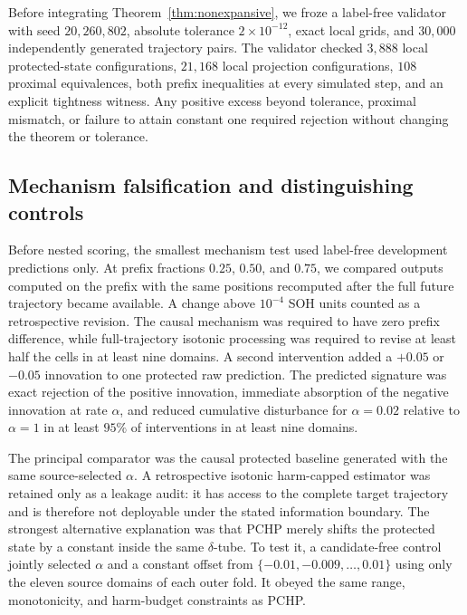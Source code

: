\documentclass[11pt]{article}
\begin{document}
Before integrating Theorem~\ref{thm:nonexpansive}, we froze a label-free validator with seed $20{,}260{,}802$, absolute tolerance $2\times10^{-12}$, exact local grids, and $30{,}000$ independently generated trajectory pairs. The validator checked $3{,}888$ local protected-state configurations, $21{,}168$ local projection configurations, $108$ proximal equivalences, both prefix inequalities at every simulated step, and an explicit tightness witness. Any positive excess beyond tolerance, proximal mismatch, or failure to attain constant one required rejection without changing the theorem or tolerance.

\subsection{Mechanism falsification and distinguishing controls}

Before nested scoring, the smallest mechanism test used label-free development predictions only. At prefix fractions $0.25$, $0.50$, and $0.75$, we compared outputs computed on the prefix with the same positions recomputed after the full future trajectory became available. A change above $10^{-4}$ SOH units counted as a retrospective revision. The causal mechanism was required to have zero prefix difference, while full-trajectory isotonic processing was required to revise at least half the cells in at least nine domains. A second intervention added a $+0.05$ or $-0.05$ innovation to one protected raw prediction. The predicted signature was exact rejection of the positive innovation, immediate absorption of the negative innovation at rate $\alpha$, and reduced cumulative disturbance for $\alpha=0.02$ relative to $\alpha=1$ in at least $95\%$ of interventions in at least nine domains.

The principal comparator was the causal protected baseline generated with the same source-selected $\alpha$. A retrospective isotonic harm-capped estimator was retained only as a leakage audit: it has access to the complete target trajectory and is therefore not deployable under the stated information boundary. The strongest alternative explanation was that PCHP merely shifts the protected state by a constant inside the same $\delta$-tube. To test it, a candidate-free control jointly selected $\alpha$ and a constant offset from $\{-0.01,-0.009,\ldots,0.01\}$ using only the eleven source domains of each outer fold. It obeyed the same range, monotonicity, and harm-budget constraints as PCHP.
\end{document}
